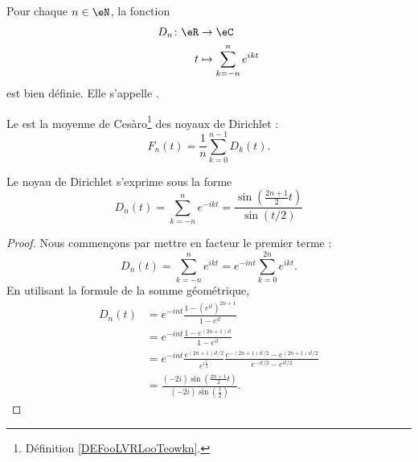 \begin{propositionDef}      \label{PROPooUOKAooGzGZWc}
	Pour chaque \( n\in \eN\), la fonction
	\begin{equation}
		\begin{aligned}
			D_n\colon \eR & \to \eC                        \\
			t             & \mapsto \sum_{k=-n}^n  e^{ikt}
		\end{aligned}
	\end{equation}
	est bien définie. Elle s'appelle .
\end{propositionDef}

\begin{definition}
	Le  est la moyenne de Cesàro\footnote{Définition \ref{DEFooLVRLooTeowkn}.} des noyaux de Dirichlet :
	\begin{equation}
		F_n(t)=\frac{1}{ n }\sum_{k=0}^{n-1}D_k(t).
	\end{equation}
\end{definition}

\begin{lemma}   \label{LemHPoIkwu}
	Le noyau de Dirichlet s'exprime sous la forme
	\begin{equation}
		D_n(t)=\sum_{k=-n}^n e^{-ikt}=\frac{ \sin\left( \frac{ 2n+1 }{ 2 }t \right) }{ \sin(t/2) }
	\end{equation}
\end{lemma}

\begin{proof}
	Nous commençons par mettre en facteur le premier terme :
	\begin{equation}
		D_n(t)=\sum_{k=-n}^n e^{ikt}= e^{-int}\sum_{k=0}^{2n} e^{ikt}.
	\end{equation}
	En utilisant la formule de la somme géométrique,
	\begin{subequations}
		\begin{align}
			D_n(t) & = e^{-int}\frac{ 1-( e^{it})^{2n+1} }{ 1- e^{it} }                                                                       \\
			       & = e^{-int}\frac{ 1- e^{(2n+1)it} }{ 1- e^{it} }                                                                          \\
			       & = e^{-int}\frac{ e^{(2n+1)it/2} }{ e^{i\frac{ t }{ 2 }} }\frac{ e^{-(2n+1)it/2}- e^{(2n+1)it/2} }{ e^{-it/2}- e^{it/2} } \\
			       & = \frac{ (-2i)\sin\left( \frac{ 2n+1 }{ 2 }t \right) }{ (-2i)\sin\left( \frac{ t }{2} \right) }.
		\end{align}
	\end{subequations}
\end{proof}

